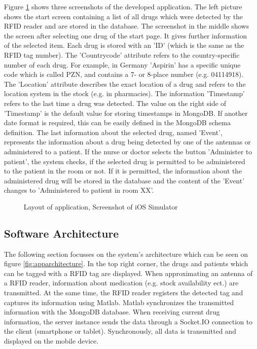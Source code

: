 Figure \ref{fig:app_screenshot} shows three screenshots of the developed application. The left picture shows the start screen containing a list of all drugs which were detected by the RFID reader and are stored in the database. The screenshot in the middle shows the screen after selecting one drug of the start page. It gives further information of the selected item. Each drug is stored with an 'ID' (which is the same as the RFID tag number). The 'Countrycode' attribute refers to the country-specific number of each drug. For example, in Germany 'Aspirin' has a specific unique code which is called \ac{PZN}, and contains a 7- or 8-place number (e.g. 04114918). The 'Location' attribute describes the exact location of a drug and refers to the location system in the stock (e.g. in pharmacies). The information 'Timestamp' refers to the last time a drug was detected. The value on the right side of 'Timestamp' is the default value for storing timestamps in MongoDB. If another date format is required, this can be easily defined in the MongoDB schema definition. The last information about the selected drug, named 'Event', represents the information about a drug being detected by one of the antennas or administered to a patient. If the nurse or doctor selects the button 'Administer to patient', the system checks, if the selected drug is permitted to be administered to the patient in the room or not. If it is permitted, the information about the administered drug will be stored in the database and the content of the 'Event' changes to 'Administered to patient in room XX'.

\begin{figure}
\centering
{}
\caption{\label{fig:app_screenshot}Layout of application, Screenshot of iOS Simulator}
\end{figure}

\subsection{Software Architecture} \label{section_architecture}

The following section focusses on the system's architecture which can be seen on figure \ref{fig:apparchitecture}. In the top right corner, the drugs and patients which can be tagged with a RFID tag are displayed. When approximating an antenna of a RFID reader, information about medication (e.g. stock availability ect.) are transmitted. At the same time, the RFID reader registers the detected tag and captures its information using Matlab. Matlab synchronizes the transmitted information with the MongoDB database. When receiving current drug information, the server instance sends the data through a Socket.IO connection to the client (smartphone or tablet). Synchronously, all data is transmitted and displayed on the mobile device.

